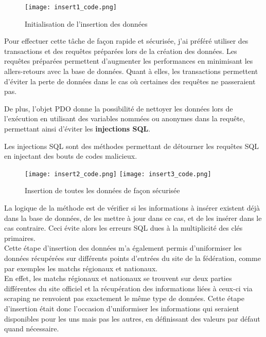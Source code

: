 \begin{figure}[!h]
    \centering
    \texttt{[image: insert1\_code.png]}
    \caption{Initialisation de l'insertion des données}
\end{figure}

Pour effectuer cette tâche de façon rapide et sécurisée, j’ai préféré utiliser des transactions et des requêtes préparées lors de la création des données. 
Les requêtes préparées permettent d’augmenter les performances en minimisant les allers-retours avec la base de données. 
Quant à elles, les transactions permettent d’éviter la perte de données dans le cas où certaines des requêtes ne passeraient pas.

De plus, l’objet PDO donne la possibilité de nettoyer les données lors de l’exécution en utilisant des variables nommées ou anonymes dans la requête, permettant ainsi d’éviter les \textbf{injections SQL}.

\begin{commentaire}
    Les injections SQL sont des méthodes permettant de détourner les requêtes SQL en injectant des bouts de codes malicieux.
\end{commentaire}

\begin{figure}[!h]
    \centering
    \texttt{[image: insert2\_code.png]}
    \texttt{[image: insert3\_code.png]}
    \caption{Insertion de toutes les données de façon sécurisée}
\end{figure}

\newpage

La logique de la méthode  est de vérifier si les informations à insérer existent déjà dans la base de données, de les mettre à jour dans ce cas, et de les insérer dans le cas contraire. Ceci évite alors les erreurs SQL dues à la multiplicité des clés primaires.\\

Cette étape d’insertion des données m’a également permis d’uniformiser les données récupérées sur différents points d’entrées du site de la fédération, comme par exemples les matchs régionaux et nationaux.\\

En effet, les matchs régionaux et nationaux se trouvent sur deux parties différentes du site officiel et la récupération des informations liées à ceux-ci via scraping ne renvoient pas exactement le même type de données. Cette étape d’insertion était donc l’occasion d’uniformiser les informations qui seraient disponibles pour les uns mais pas les autres, en définissant des valeurs par défaut quand nécessaire.